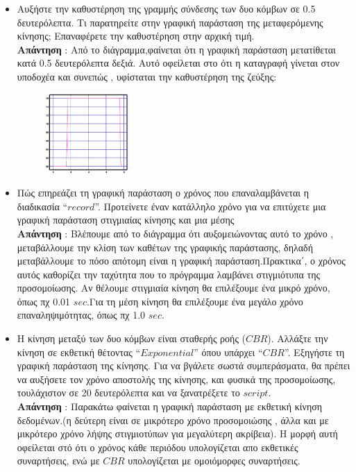 \documentclass{article}%
\begin{document}
\begin{itemize}
\item Αυξήστε την καθυστέρηση της γραμμής σύνδεσης των δυο κόμβων σε 0.5 δευτερόλεπτα. Τι
παρατηρείτε στην γραφική παράσταση της μεταφερόμενης κίνησης; Επαναφέρετε την καθυστέρηση
στην αρχική τιμή. \\
\textbf{Απάντηση} : Από το διάγραμμα,φαίνεται ότι η γραφική παράσταση μετατίθεται κατά 0.5 δευτερόλεπτα δεξιά. Αυτό οφείλεται στο ότι η καταγραφή γίνεται στον υποδοχέα και συνεπώς , υφίσταται την καθυστέρηση της ζεύξης:
\begin{figure}[htbp]
	\centering
		\includegraphics[width=0.30\textwidth]{5.png}
\end{figure}

\item Πώς επηρεάζει τη γραφική παράσταση ο χρόνος που επαναλαμβάνεται η διαδικασία “$record$”.
Προτείνετε έναν κατάλληλο χρόνο για να επιτύχετε μια γραφική παράσταση στιγμιαίας κίνησης και
μια μέσης\\
\textbf{Απάντηση} : Βλέπουμε από το διάγραμμα ότι αυξομειώνοντας αυτό το χρόνο , μεταβάλλουμε την κλίση των καθέτων της γραφικής παράστασης, δηλαδή μεταβάλλουμε το πόσο απότομη είναι η γραφική παράσταση.Πρακτικα΄,  ο χρόνος αυτός καθορίζει την ταχύτητα που το πρόγραμμα λαμβάνει στιγμιότυπα της προσομοίωσης. Αν θέλουμε στιγμιαία κίνηση θα επιλέξουμε ένα μικρό χρόνο, όπως πχ 0.01 $sec$.Για τη μέση κίνηση θα επιλέξουμε ένα μεγάλο χρόνο επαναληψιμότητας, όπως πχ 1.0 $sec$.  
\item Η κίνηση μεταξύ των δυο κόμβων είναι σταθερής ροής ($CBR$). Αλλάξτε την κίνηση σε εκθετική
θέτοντας “$Exponential$” όπου υπάρχει “$CBR$”. Εξηγήστε τη γραφική παράσταση της κίνησης. Για να
βγάλετε σωστά συμπεράσματα, θα πρέπει να αυξήσετε τον χρόνο αποστολής της κίνησης, και
φυσικά της προσομοίωσης, τουλάχιστον σε 20 δευτερόλεπτα και να ξανατρέξετε το $script$.\\ 
\textbf{Απάντηση} : Παρακάτω φαίνεται η γραφική παράσταση με εκθετική κίνηση δεδομένων.(η δεύτερη είναι σε μικρότερο χρόνο προσομοιώσης , άλλα και με μικρότερο χρόνο λήψης στιγμιοτύπων για μεγαλύτερη ακρίβεια). Η μορφή αυτή οφείλεται στό ότι ο χρόνος κάθε περιόδου υπολογίζεται απο εκθετικές συναρτήσεις, ενώ με $CBR$ υπολογίζεται με ομοιόμορφες συναρτήσεις.


\end{itemize}
\end{document}
